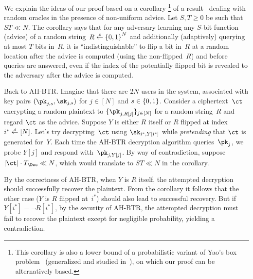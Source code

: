 We explain the ideas of our proof based on a corollary%
\footnote{This corollary is also a lower bound of a probabilistic variant of Yao's box problem~\cite{STOC:Yao90} (generalized and studied in~\cite{EC:CorHenKog22}), on which our proof can be alternatively based.
}
of a result~\cite{C:Unruh07} dealing with random oracles in the presence of non-uniform advice.
Let ${S,T\geq 0}$ be such that ${ST\ll N}$.
The corollary says that
for any adversary learning any $S$-bit function (advice) of a random string~${R\draws\bit^N}$ and additionally (adaptively) querying at most $T$ bits in~$R$,
it is ``indistinguishable'' to flip a bit in~$R$ at a random location
after the advice is computed (using the non-flipped~$R$) and
before queries are answered,
even if the index of the potentially flipped bit is revealed to the adversary after the advice is computed.

Back to AH-BTR. Imagine that there are $2N$ users in the system, associated with key pairs $(\pk_{j,s},\sk_{j,s})$ for ${j\in[N]}$ and ${s\in{\{0,1\}}}$.
Consider a ciphertext~$\ct$ encrypting a random plaintext to $\{\pk_{j,R[j]}\}_{j\in[N]}$ for a random string~$R$ and
regard $\ct$ as the advice.
Suppose $Y$ is either $R$ itself or $R$ flipped at index ${i^\ast\draws[N]}$.
Let's try decrypting~$\ct$ using $\sk_{i^\ast,Y[i^\ast]}$
while \emph{pretending} that $\ct$ is generated for~$Y$.
Each time the AH-BTR decryption algorithm queries~$\pk_j$,
we probe $Y[j]$ and respond with~$\pk_{j,Y[j]}$.
By way of contradiction, suppose ${|\ct|\cdot T_\Dec\ll N}$,
which would translate to ${ST\ll N}$ in the corollary.

By the correctness of AH-BTR, when $Y$ is $R$ itself,
the attempted decryption should successfully recover the plaintext.
From the corollary it follows that the other case
($Y$ is $R$ flipped at~$i^\ast$)
should also lead to successful recovery.
But if ${Y[i^\ast]=\neg R[i^\ast]}$,
by the security of AH-BTR,
the attempted decryption must fail to recover the plaintext except for negligible probability, yielding a contradiction.
